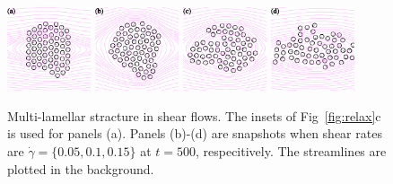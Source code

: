 \documentclass[aps,prl,preprint,groupedaddress]{revtex4-2}
\begin{document}
\begin{figure}
  \begin{center}
  \includegraphics[width=0.22\textwidth]{MS_0.pdf}
  \includegraphics[width=0.22\textwidth]{MS_1.pdf}
  \includegraphics[width=0.22\textwidth]{MS_2.pdf} 
    \includegraphics[width=0.22\textwidth]{MS_3.pdf} 
  \end{center}
  \vspace{-20pt}  
  \caption{\label{fig:BC2_shear_flow} Multi-lamellar stracture in shear flows. The insets of Fig~\ref{fig:relax}c is used for panels (a). Panels (b)-(d) are snapshots when shear rates are $\dot\gamma=\{0.05, 0.1, 0.15\}$ at $t=500$, respecitively. The streamlines are plotted in the background.}
\end{figure}
\end{document}

